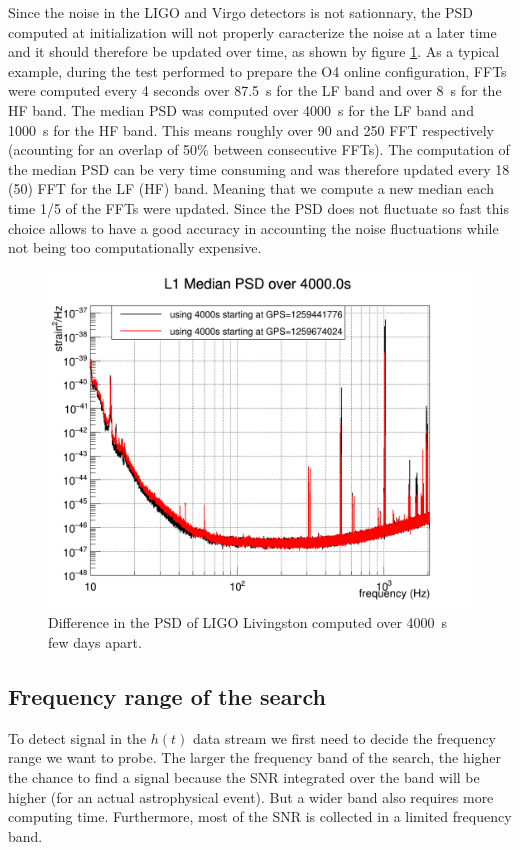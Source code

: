 Since the noise in the LIGO and Virgo detectors is not sationnary, the PSD computed at initialization will not properly caracterize the noise at a later time and it should therefore be updated over time, as shown by figure \ref{fig:psd_time}.
As a typical example, during the test performed to prepare the O4 online configuration, FFTs were computed every 4 seconds over \SI{87.5}{s} for the LF band and over \SI{8}{s} for the HF band.
The median PSD was computed over \SI{4000}{s} for the LF band and \SI{1000}{s} for the HF band.
This means roughly over 90 and 250 FFT respectively (acounting for an overlap of 50\% between consecutive FFTs).
The computation of the median PSD can be very time consuming and was therefore updated every 18 (50) FFT for the LF (HF) band.
Meaning that we compute a new median each time 1/5 of the FFTs were updated.
Since the PSD does not fluctuate so fast this choice allows to have a good accuracy in accounting the noise fluctuations while not being too computationally expensive.

\begin{figure}[ht]
  \centering
  \includegraphics[width=0.6\linewidth]{sectionMBTA/cComparePSD3.png}
  \caption{Difference in the PSD of LIGO Livingston computed over \SI{4000}{s} few days apart.}
  \label{fig:psd_time}
\end{figure}



\subsection{Frequency range of the search}
To detect signal in the $h(t)$ data stream we first need to decide the frequency range we want to probe.
The larger the frequency band of the search, the higher the chance to find a signal because the SNR integrated over the band will be higher (for an actual astrophysical event).
But a wider band also requires more computing time.
Furthermore, most of the SNR is collected in a limited frequency band.


